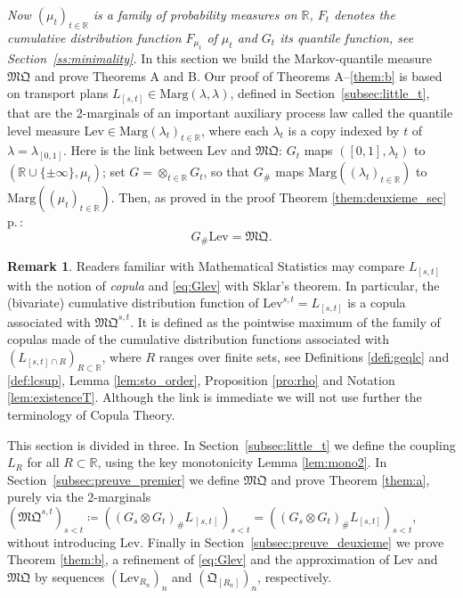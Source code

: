 \documentclass[JEP,XML,SOM,Unicode,NoEqCountersInSection,NoFloatCountersInSection,published]{cedram}
\theoremstyle{plain}
\theoremstyle{definition}
\newtheorem{rem}[them]{Remark}
\newcommand{\como}{\mathfrak{Q}}
\newcommand{\mq}{\mathfrak{MQ}}
\newcommand{\lev}{\mathrm{Lev}}
\newcommand{\eqdef}{\coloneqq}
\newcommand{\la}{\lambda}
\newcommand{\ma}{\mathrm{Marg}}
\newcommand{\R}{\mathbb{R}}
\newcommand{\op}{\mathopen}
\newcommand{\clo}{\mathclose}
\begin{document}
\emph{Now $(\mu_t)_{t\in \R}$ is a family of probability measures on $\R$, $F_t$ denotes the cumulative distribution function $F_{\mu_t}$ of $\mu_t$ and $G_t$ its quantile function, see Section~\ref{ss:minimality}.} In this section we build the Markov-quantile measure $\mq$ and prove Theorems A and B. Our proof of Theorems A--\ref{them:b} is based on transport plans $L_{[s,t]}\in \ma(\la,\la)$, defined in Section~\ref{subsec:little_t}, that are the 2-marginals of an important auxiliary process law called the quantile level measure $\lev\in\ma(\la_t)_{t\in\R}$, where each $\lambda_t$ is a copy indexed by $t$ of $\la=\la_{[0,1]}$. Here is the link between $\lev$ and $\mq$: $G_t$ maps $([0,1],\la_t)$ to $(\R\cup\{\pm \infty\},\mu_t)$; set $G=\otimes_{t\in\R}G_t$, so that $G_\#$ maps $\ma((\lambda_t)_{t\in\R})$ to $\ma((\mu_t)_{t\in\R})$. Then, as proved in the proof Theorem \ref{them:deuxieme_sec} p.\,\pageref{lieu_preuve_glev}:\vspace*{-3pt}
\begin{equation}\label{eq:Glev}
G_\#\lev=\mq.
\end{equation}

\begin{rem}
Readers familiar with Mathematical Statistics may compare $L_{[s,t]}$ with the notion of \emph{copula} and \eqref{eq:Glev} with Sklar's theorem. In particular, the (bivariate) cumulative distribution function of $\lev^{s,t}=L_{[s,t]}$ is a copula associated with $\mq^{s,t}$. It is defined as the pointwise maximum of the family of copulas made of the cumulative distribution functions associated with $(L_{[s,t]\cap R})_{R\subset \R}$, where $R$ ranges over finite sets, see Definitions \ref{defi:geqlc} and \ref{def:lcsup}, Lemma \ref{lem:sto_order}, Proposition \ref{pro:rho} and Notation \ref{lem:existenceT}. Although the link is immediate we will not use further the terminology of Copula Theory.
\end{rem}

This section is divided in three. In Section~\ref{subsec:little_t} we define the coupling $L_R$ for all $R\subset \R$, using the key monotonicity Lemma \ref{lem:mono2}. In Section~\ref{subsec:preuve_premier} we define $\mq$ and prove Theorem \ref{them:a}, purely via the 2-marginals $(\mq^{s,t})_{s<t}\eqdef((G_s\otimes G_t)_\#L_{\op]s,t\clo[})_{s<t}=((G_s\otimes G_t)_\#L_{[s,t]})_{s<t}$, \ie without introducing $\lev$. Finally in Section~\ref{subsec:preuve_deuxieme} we prove Theorem \ref{them:b}, \ie a refinement of \eqref{eq:Glev} and the approximation of $\lev$ and $\mq$ by sequences $(\lev_{R_n})_n$ and $(\como_{[R_n]})_n$, respectively.
\end{document}
